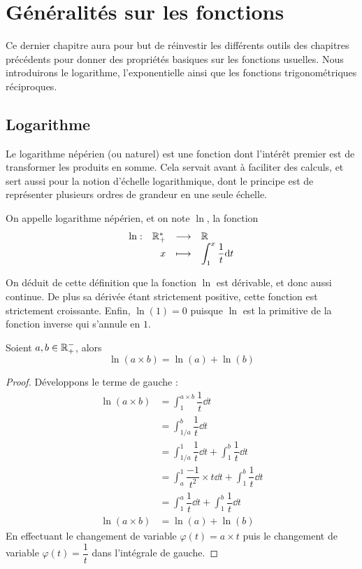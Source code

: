 \section{Généralités sur les fonctions}

Ce dernier chapitre aura pour but de réinvestir les différents outils des chapitres précédents pour donner des propriétés basiques sur les fonctions usuelles. Nous introduirons le logarithme, l'exponentielle ainsi que les fonctions trigonométriques réciproques.

\subsection{Logarithme}

Le logarithme népérien (ou naturel) est une fonction dont l'intérêt premier est de transformer les produits en somme. Cela servait avant à faciliter des calculs, et sert aussi pour la notion d'échelle logarithmique, dont le principe est de représenter plusieurs ordres de grandeur en une seule échelle.

\begin{defi}
    On appelle logarithme népérien, et on note $\ln$, la fonction $$\begin{array}[t]{lrcl} \ln: & \mathbb{R}_+^* & \longrightarrow & \mathbb{R} \\ & x & \longmapsto & \displaystyle\int_1^x\dfrac{1}{t}\mathrm{d} t \end{array}$$
\end{defi}

On déduit de cette définition que la fonction $\ln$ est dérivable, et donc aussi continue. De plus sa dérivée étant strictement positive, cette fonction est strictement croissante. Enfin, $\ln(1)=0$ puisque $\ln$ est la primitive de la fonction inverse qui s'annule en $1$.

\begin{prop}
    Soient $a,b\in\mathbb{R}_+^-$, alors $$\ln(a\times b) = \ln(a)+\ln(b)$$
\end{prop}

\begin{proof}
    Développons le terme de gauche :
    \begin{align*}
        \ln(a\times b) &= \displaystyle\int_1^{a\times b} \dfrac{1}{t}\dd t\\
        &= \displaystyle\int_{1/a}^b \dfrac{1}{t}\dd t\\
        &= \displaystyle\int_{1/a}^1 \dfrac{1}{t}\dd t + \int_1^b \dfrac{1}{t}\dd t\\
        &= \displaystyle\int_a^1 \dfrac{-1}{t^2}\times t\dd t + \int_1^b \dfrac{1}{t}\dd t\\
        &= \displaystyle\int_1^a \dfrac{1}{t} \dd t + \int_1^b \dfrac{1}{t}\dd t\\
        \ln(a\times b) &= \ln(a) + \ln(b)
    \end{align*}
    En effectuant le changement de variable $\varphi(t) = a\times t$ puis le changement de variable $\varphi(t) = \dfrac{1}{t}$ dans l'intégrale de gauche.
\end{proof}

